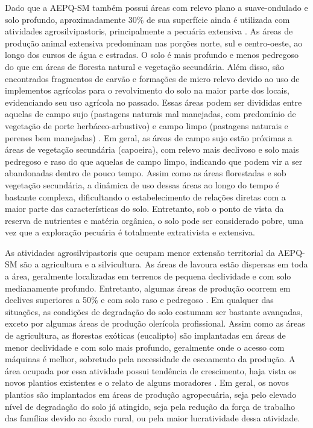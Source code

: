 \documentclass[final]{article}
\begin{document}
Dado que a AEPQ-SM também possui áreas com relevo plano a suave-ondulado e solo profundo, aproximadamente 30\% de sua superfície ainda é utilizada com atividades agrosilvipastoris, principalmente a pecuária extensiva \cite{SamuelRosaEtAl2011a}. As áreas de produção animal extensiva predominam nas porções norte, sul e centro-oeste, ao longo dos cursos de água e estradas. O solo é mais profundo e menos pedregoso do que em áreas de floresta natural e vegetação secundária. Além disso, são encontrados fragmentos de carvão e formações de micro relevo devido ao uso de implementos agrícolas para o revolvimento do solo na maior parte dos locais, evidenciando seu uso agrícola no passado. Essas áreas podem ser divididas entre aquelas de campo sujo (pastagens naturais mal manejadas, com predomínio de vegetação de porte herbáceo-arbustivo) e campo limpo (pastagens naturais e perenes bem manejadas) \cite{SamuelRosaEtAl2011a}. Em geral, as áreas de campo sujo estão próximas a áreas de vegetação secundária (capoeira), com relevo mais declivoso e solo mais pedregoso e raso do que aquelas de campo limpo, indicando que podem vir a ser abandonadas dentro de pouco tempo. Assim como as áreas florestadas e sob vegetação secundária, a dinâmica de uso dessas áreas ao longo do tempo é bastante complexa, dificultando o estabelecimento de relações diretas com a maior parte das características do solo. Entretanto, sob o ponto de vista da reserva de nutrientes e matéria orgânica, o solo pode ser considerado pobre, uma vez que a exploração pecuária é totalmente extrativista e extensiva.


As atividades agrosilvipastoris que ocupam menor extensão territorial da AEPQ-SM são a agricultura e a silvicultura. As áreas de lavoura estão dispersas em toda a área, geralmente localizadas em terrenos de pequena declividade e com solo medianamente profundo. Entretanto, algumas áreas de produção ocorrem em declives superiores a 50\% e com solo raso e pedregoso \cite{SamuelRosaEtAl2011a}. Em qualquer das situações, as condições de degradação do solo costumam ser bastante avançadas, exceto por algumas áreas de produção olerícola profissional. Assim como as áreas de agricultura, as florestas exóticas (eucalipto) são implantadas em áreas de menor declividade e com solo mais profundo, geralmente onde o acesso com máquinas é melhor, sobretudo pela necessidade de escoamento da produção. A área ocupada por essa atividade possui tendência de crescimento, haja vista os novos plantios existentes e o relato de alguns moradores \cite{SamuelRosaEtAl2011a}. Em geral, os novos plantios são implantados em áreas de produção agropecuária, seja pelo elevado nível de degradação do solo já atingido, seja pela redução da força de trabalho das famílias devido ao êxodo rural, ou pela maior lucratividade dessa atividade.
\end{document}
